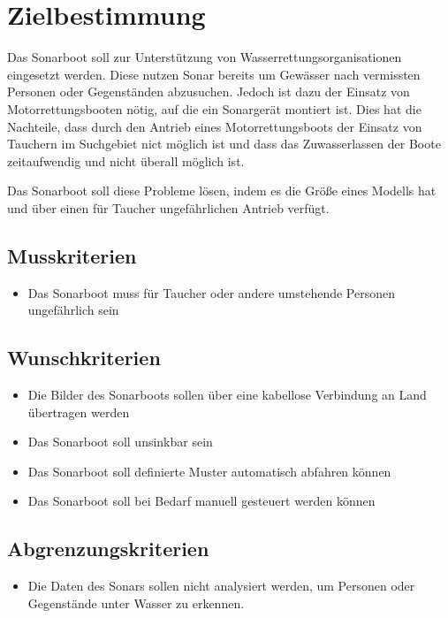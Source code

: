 \documentclass[a4paper]{article}
\begin{document}
\section{Zielbestimmung}

Das Sonarboot soll zur Unterstützung von Wasserrettungsorganisationen eingesetzt werden.
Diese nutzen Sonar bereits um Gewässer nach vermissten Personen oder Gegenständen abzusuchen.
Jedoch ist dazu der Einsatz von Motorrettungsbooten nötig, auf die ein Sonargerät montiert ist.
Dies hat die Nachteile, dass durch den Antrieb eines Motorrettungsboots der Einsatz von Tauchern im
Suchgebiet nict möglich ist und dass das Zuwasserlassen der Boote zeitaufwendig und nicht überall 
möglich ist.

Das Sonarboot soll diese Probleme lösen, indem es die Größe eines Modells hat und über einen für
Taucher ungefährlichen Antrieb verfügt.

\subsection{Musskriterien}

\begin{itemize}
	\item Das Sonarboot muss für Taucher oder andere umstehende Personen ungefährlich sein
\end{itemize}

\subsection{Wunschkriterien}

\begin{itemize}
	\item Die Bilder des Sonarboots sollen über eine kabellose Verbindung an Land übertragen werden
	\item Das Sonarboot soll unsinkbar sein
	\item Das Sonarboot soll definierte Muster automatisch abfahren können
	\item Das Sonarboot soll bei Bedarf manuell gesteuert werden können
\end{itemize}

\subsection{Abgrenzungskriterien}

\begin{itemize}
	\item Die Daten des Sonars sollen nicht analysiert werden, um Personen oder Gegenstände unter 
	Wasser zu erkennen.
\end{itemize}
\end{document}
